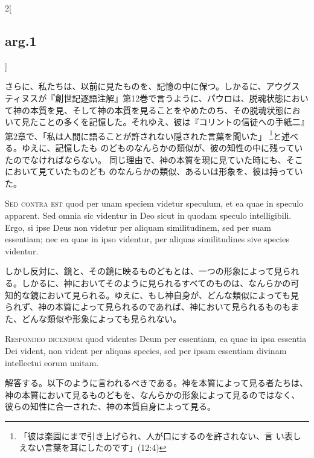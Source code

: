 \documentclass[paper=a4paper,fontsize=10pt,jafontsize=9pt,titlepage]{jlreq}
\begin{document}
\begin{paracol}{2}[\subsection{arg.1}]
\switchcolumn

さらに、私たちは、以前に見たものを、記憶の中に保つ。しかるに、アウグス
ティヌスが『創世記逐語注解』第12巻で言うように、パウロは、脱魂状態におい
て神の本質を見、そして神の本質を見ることをやめたのち、その脱魂状態にお
いて見たことの多くを記憶した。それゆえ、彼は『コリントの信徒への手紙二』
第2章で、「私は人間に語ることが許されない隠された言葉を聞いた」
\footnote{「彼は楽園にまで引き上げられ、人が口にするのを許されない、言
い表しえない言葉を耳にしたのです」(12:4)}と述べる。ゆえに、記憶したも
のどものなんらかの類似が、彼の知性の中に残っていたのでなければならない。
同じ理由で、神の本質を現に見ていた時にも、そこにおいて見ていたものども
のなんらかの類似、あるいは形象を、彼は持っていた。

\switchcolumn*[\subsection{s.c.}]

{\scshape  Sed contra est} quod per unam speciem videtur speculum, et
 ea quae in speculo apparent. Sed omnia sic videntur in Deo sicut in
 quodam speculo intelligibili. Ergo, si ipse Deus non videtur per
 aliquam similitudinem, sed per suam essentiam; nec ea quae in ipso
 videntur, per aliquas similitudines sive species videntur.

\switchcolumn

しかし反対に、鏡と、その鏡に映るものどもとは、一つの形象によって見られ
る。しかるに、神においてそのように見られるすべてのものは、なんらかの可
知的な鏡において見られる。ゆえに、もし神自身が、どんな類似によっても見
られず、神の本質によって見られるのであれば、神において見られるものもま
た、どんな類似や形象によっても見られない。


{\scshape Respondeo dicendum} quod videntes Deum per essentiam, ea quae in
ipsa essentia Dei vident, non vident per aliquas species, sed per
ipsam essentiam divinam intellectui eorum unitam.

\switchcolumn

解答する。以下のように言われるべきである。神を本質によって見る者たちは、
神の本質において見るものどもを、なんらかの形象によって見るのではなく、
彼らの知性に合一された、神の本質自身によって見る。

\switchcolumn*


\end{paracol}
\end{document}
